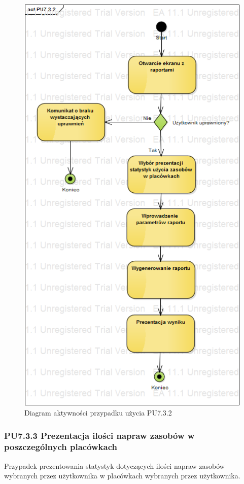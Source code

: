 \begin{figure}[h!]
	\centering
	\includegraphics[scale=0.6]{img/diagrams/activityDiagrams/PU732}
	\caption{Diagram aktywności przypadku użycia PU7.3.2 \label{fig:labelADPU7.3.2}}
\end{figure}

\subsubsection{PU7.3.3 Prezentacja ilości napraw zasobów w poszczególnych placówkach}
Przypadek prezentowania statystyk dotyczących ilości napraw zasobów wybranych przez użytkownika w placówkach wybranych przez użytkownika.

